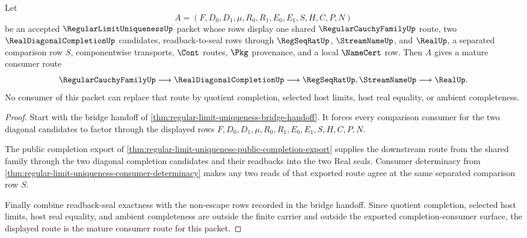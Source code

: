 \begin{theorem}
\label{thm:regular-limit-uniqueness-mature-consumer-route}
Let
$$
A=(F,D_0,D_1,\mu,R_0,R_1,E_0,E_1,S,H,C,P,N)
$$
be an accepted $\RegularLimitUniquenessUp$ packet whose rows display one shared $\RegularCauchyFamilyUp$ route, two $\RealDiagonalCompletionUp$ candidates, readback-to-seal rows through $\RegSeqRatUp$, $\StreamNameUp$, and $\RealUp$, a separated comparison row $S$, componentwise transports, $\Cont$ routes, $\Pkg$ provenance, and a local $\NameCert$ row. Then $A$ gives a mature consumer route
$$
\RegularCauchyFamilyUp \longrightarrow \RealDiagonalCompletionUp \longrightarrow \RegSeqRatUp,\StreamNameUp \longrightarrow \RealUp.
$$
No consumer of this packet can replace that route by quotient completion, selected host limits, host real equality, or ambient completeness.
\end{theorem}
\begin{proof}
Start with the bridge handoff of \autoref{thm:regular-limit-uniqueness-bridge-handoff}. It forces every comparison consumer for the two diagonal candidates to factor through the displayed rows $F,D_0,D_1,\mu,R_0,R_1,E_0,E_1,S,H,C,P,N$.

The public completion export of \autoref{thm:regular-limit-uniqueness-public-completion-export} supplies the downstream route from the shared family through the two diagonal completion candidates and their readbacks into the two Real seals. Consumer determinacy from \autoref{thm:regular-limit-uniqueness-consumer-determinacy} makes any two reads of that exported route agree at the same separated comparison row $S$.

Finally combine readback-seal exactness with the non-escape rows recorded in the bridge handoff. Since quotient completion, selected host limits, host real equality, and ambient completeness are outside the finite carrier and outside the exported completion-consumer surface, the displayed route is the mature consumer route for this packet.
\end{proof}

